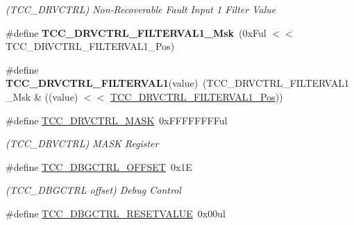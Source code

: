 \begin{DoxyCompactItemize}
\begin{DoxyCompactList}\small\item\em (T\+C\+C\+\_\+\+D\+R\+V\+C\+T\+R\+L) Non-\/\+Recoverable Fault Input 1 Filter Value \end{DoxyCompactList}\item 
\hypertarget{group___s_a_m_l21___t_c_c_gaab80a4769623857fd29195eb0a991e52}{}\#define {\bfseries T\+C\+C\+\_\+\+D\+R\+V\+C\+T\+R\+L\+\_\+\+F\+I\+L\+T\+E\+R\+V\+A\+L1\+\_\+\+Msk}~(0x\+Ful $<$$<$ T\+C\+C\+\_\+\+D\+R\+V\+C\+T\+R\+L\+\_\+\+F\+I\+L\+T\+E\+R\+V\+A\+L1\+\_\+\+Pos)\label{group___s_a_m_l21___t_c_c_gaab80a4769623857fd29195eb0a991e52}

\item 
\hypertarget{group___s_a_m_l21___t_c_c_ga221e85f041342c9dffd3fc512347feb4}{}\#define {\bfseries T\+C\+C\+\_\+\+D\+R\+V\+C\+T\+R\+L\+\_\+\+F\+I\+L\+T\+E\+R\+V\+A\+L1}(value)~(T\+C\+C\+\_\+\+D\+R\+V\+C\+T\+R\+L\+\_\+\+F\+I\+L\+T\+E\+R\+V\+A\+L1\+\_\+\+Msk \& ((value) $<$$<$ \hyperlink{group___s_a_m_l21___t_c_c_ga6d71fc13ce573ac216539f160646dff1}{T\+C\+C\+\_\+\+D\+R\+V\+C\+T\+R\+L\+\_\+\+F\+I\+L\+T\+E\+R\+V\+A\+L1\+\_\+\+Pos}))\label{group___s_a_m_l21___t_c_c_ga221e85f041342c9dffd3fc512347feb4}

\item 
\hypertarget{group___s_a_m_l21___t_c_c_ga4bf7ef8442b35b36d7efac3dc1e5aee5}{}\#define \hyperlink{group___s_a_m_l21___t_c_c_ga4bf7ef8442b35b36d7efac3dc1e5aee5}{T\+C\+C\+\_\+\+D\+R\+V\+C\+T\+R\+L\+\_\+\+M\+A\+S\+K}~0x\+F\+F\+F\+F\+F\+F\+F\+Ful\label{group___s_a_m_l21___t_c_c_ga4bf7ef8442b35b36d7efac3dc1e5aee5}

\begin{DoxyCompactList}\small\item\em (T\+C\+C\+\_\+\+D\+R\+V\+C\+T\+R\+L) M\+A\+S\+K Register \end{DoxyCompactList}\item 
\hypertarget{group___s_a_m_l21___t_c_c_ga563c2bf0f2fd8c50c9d628606d446f33}{}\#define \hyperlink{group___s_a_m_l21___t_c_c_ga563c2bf0f2fd8c50c9d628606d446f33}{T\+C\+C\+\_\+\+D\+B\+G\+C\+T\+R\+L\+\_\+\+O\+F\+F\+S\+E\+T}~0x1\+E\label{group___s_a_m_l21___t_c_c_ga563c2bf0f2fd8c50c9d628606d446f33}

\begin{DoxyCompactList}\small\item\em (T\+C\+C\+\_\+\+D\+B\+G\+C\+T\+R\+L offset) Debug Control \end{DoxyCompactList}\item 
\hypertarget{group___s_a_m_l21___t_c_c_ga07c9bd9aa2aa3f9c8486cd4f77884dea}{}\#define \hyperlink{group___s_a_m_l21___t_c_c_ga07c9bd9aa2aa3f9c8486cd4f77884dea}{T\+C\+C\+\_\+\+D\+B\+G\+C\+T\+R\+L\+\_\+\+R\+E\+S\+E\+T\+V\+A\+L\+U\+E}~0x00ul\label{group___s_a_m_l21___t_c_c_ga07c9bd9aa2aa3f9c8486cd4f77884dea}


\end{DoxyCompactItemize}
